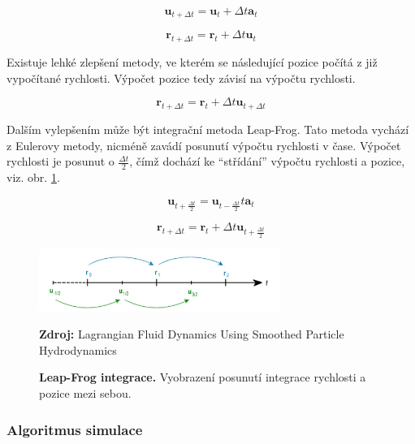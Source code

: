 \begin{equation}
    \mathbf{u}_{t + \Delta t} = \mathbf{u}_t + \Delta t \mathbf{a}_t
\end{equation}

\begin{equation}
    \mathbf{r}_{t + \Delta t} = \mathbf{r}_t + \Delta t \mathbf{u}_t
\end{equation}

Existuje lehké zlepšení metody, ve kterém se následující pozice počítá z již vypočítané rychlosti. Výpočet pozice tedy závisí na výpočtu rychlosti. \cite{KelagerSPH}

\begin{equation}
    \mathbf{r}_{t + \Delta t} = \mathbf{r}_t + \Delta t \mathbf{u}_{t + \Delta t}
\end{equation}

Dalším vylepšením může být integrační metoda Leap-Frog. Tato metoda vychází z Eulerovy metody, nicméně zavádí posunutí výpočtu rychlosti v čase. Výpočet rychlosti je posunut o $\frac{\Delta t}{2}$, čímž dochází ke \enquote{střídání} výpočtu rychlosti a pozice, viz. obr. \ref{fig:LeapFrog}.

\begin{equation}
    \mathbf{u}_{t + \frac{\Delta t}{2}} = \mathbf{u}_{t - \frac{\Delta t}{2}} t \mathbf{a}_t
    \label{eq:LeapVel}
\end{equation}

\begin{equation}
    \mathbf{r}_{t + \Delta t} = \mathbf{r}_t + \Delta t \mathbf{u}_{t + \frac{\Delta t}{2}}
    \label{eq:LeapPos}
\end{equation}

\begin{figure}[hbt]
	\centering
	\captionsetup{justification=centering}
	\includegraphics[width=0.7\textwidth]{obrazky-figures/leapFrog.PNG}
	\caption{\textbf{Leap-Frog integrace.} Vyobrazení posunutí integrace rychlosti a pozice mezi sebou.}
	\textbf{Zdroj: } Lagrangian Fluid Dynamics Using Smoothed Particle Hydrodynamics \cite{KelagerSPH}
	\label{fig:LeapFrog}
\end{figure}

\subsubsection{Algoritmus simulace}


